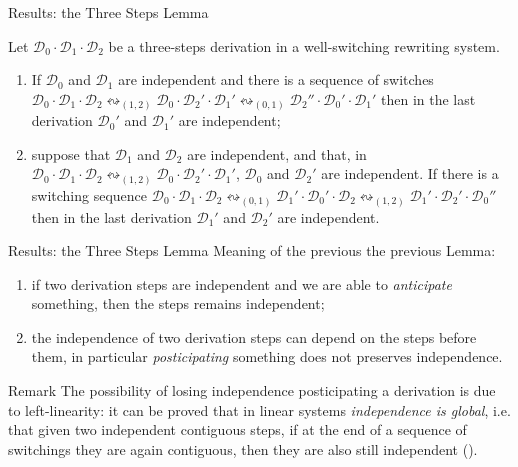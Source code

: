 \documentclass[usenames,dvipsnames]{beamer}
\newcommand{\shift}[1]{\ensuremath{\mathrel{{\leftrightsquigarrow}_{#1}}}}
\newcommand{\dder}[1]{\mathscr{#1}}
\begin{document}
\begin{frame}{Results: the Three Steps Lemma}\justifying
	
	\begin{lemma}  Let
		$\dder{D}_0\cdot \dder{D}_1 \cdot \dder{D}_2$ be a three-steps
		derivation in a well-switching rewriting system. \pause 
		\begin{enumerate}\justifying
			\item
			If $\dder{D}_0$ and $\dder{D}_1$ are independent and there is a
			sequence of switches
			$\dder{D}_0\cdot \dder{D}_1 \cdot \dder{D}_2 \shift{(1,2)}
			\dder{D}_0 \cdot \dder{D}_2' \cdot \dder{D}_1' \shift{(0,1)}
			\dder{D}_2'' \cdot \dder{D}_0' \cdot \dder{D}_1'$ then
			in the last derivation $\dder{D}_0'$ and $\dder{D}_1'$ are independent; \pause 
			
			\item 
			suppose that $\dder{D}_1$ and $\dder{D}_2$ are independent, and that, in $\dder{D}_0\cdot \dder{D}_1 \cdot \dder{D}_2 \shift{(1,2)}
			\dder{D}_0 \cdot \dder{D}_2' \cdot \dder{D}_1'$, $\dder{D}_0$ and $\dder{D}_2'$ are independent.  If there
			is a switching sequence
			$\dder{D}_0\cdot \dder{D}_1 \cdot \dder{D}_2 \shift{(0,1)}
			\dder{D}_1' \cdot \dder{D}_0' \cdot \dder{D}_2 \shift{(1,2)}
			\dder{D}_1' \cdot \dder{D}_2' \cdot \dder{D}_0''$ then in the last derivation $\dder{D}_1'$ and $\dder{D}_2'$ are independent.
		\end{enumerate}
	\end{lemma}
\end{frame}

\begin{frame}{Results: the Three Steps Lemma}\justifying
Meaning of the previous the previous Lemma: \pause 
\begin{enumerate}
	\item if two derivation steps are independent and we are able to \emph{anticipate} something, then the steps remains independent; \pause 
	\item the independence of two derivation steps can depend on the steps before them, in particular \emph{posticipating} something does not preserves independence.
\end{enumerate}
\pause 

\begin{block}{Remark}
The possibility of losing independence posticipating a derivation is due to left-linearity: it can be proved that in linear systems \emph{independence is global}, i.e. that given two independent contiguous steps, if  at the end of a sequence of switchings they are again contiguous, then they are also still independent (\cite{heindel2009category}).
\end{block}




\end{frame}
\end{document}
